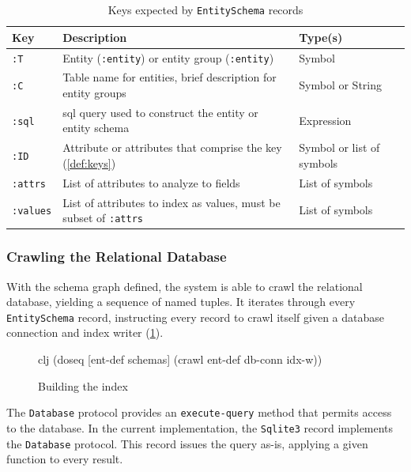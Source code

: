 			\begin{table}
				\centering
				
				\begin{tabular}{lp{9cm}l}
					\toprule
					Key & Description & Type(s) \\
					\midrule
					\texttt{:T} & Entity (\texttt{:entity}) or entity group (\texttt{:entity}) & Symbol \\
					\texttt{:C} & Table name for entities, brief description for entity groups & Symbol or String \\
					\texttt{:sql} & \Gls{sql} query used to construct the entity or entity schema & Expression \\
					\texttt{:ID} & Attribute or attributes that comprise the key (\cref{def:keys}) & Symbol or list of symbols \\
					\texttt{:attrs} & List of attributes to analyze to fields & List of symbols \\
					\texttt{:values} & List of attributes to index as values, must be subset of \texttt{:attrs} & List of symbols \\
					\bottomrule
				\end{tabular}
				
				\caption{Keys expected by \texttt{EntitySchema} records}
				\label{tbl:entity-schema-keys}
			\end{table}
		
		\subsubsection{Crawling the Relational Database}
			With the schema graph defined, the system is able to crawl the relational database, yielding a sequence of named tuples.  It iterates through every \texttt{EntitySchema} record, instructing every record to crawl itself given a database connection and index writer (\cref{clj:building-the-index}).
			
			\begin{figure}
				\begin{singlespaced}
					\begin{pygments}{clj}
(doseq [ent-def schemas]
  (crawl ent-def db-conn idx-w))
					\end{pygments}
				\end{singlespaced}
				
				\caption{Building the index}
				\label{clj:building-the-index}
			\end{figure}
			
			The \texttt{Database} protocol provides an \texttt{execute-query} method that permits access to the database.  In the current implementation, the \texttt{Sqlite3} record implements the \texttt{Database} protocol.  This record issues the query as-is, applying a given function to every result.
			

